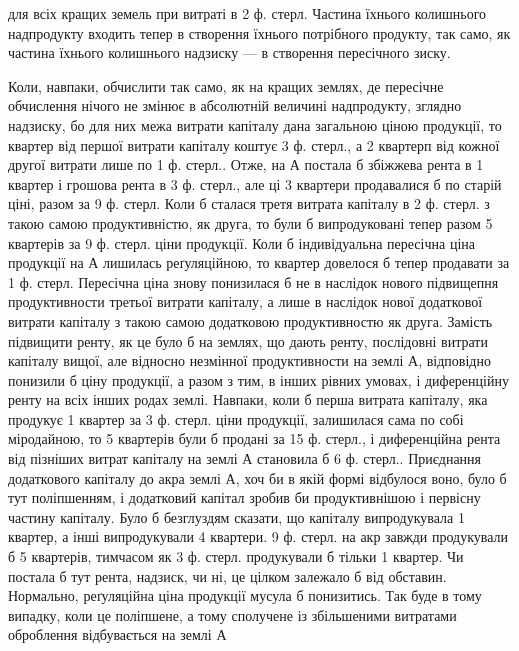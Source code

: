 \parcont{}  %
для всіх кращих земель при витраті в 2  ф. стерл. Частина їхнього колишнього
надпродукту входить тепер в створення їхнього потрібного продукту, так
само, як частина їхнього колишнього надзиску — в створення пересічного зиску.

Коли, навпаки, обчислити так само, як на кращих землях, де пересічне обчислення
нічого не змінює в абсолютній величині надпродукту, зглядно надзиску, бо для
них межа витрати капіталу дана загальною ціною продукції, то квартер від першої
витрати капіталу коштує 3 ф. стерл., а 2 квартерп від кожної другої витрати
лише по 1 ф. стерл.. Отже, на $А$ постала б збіжжева рента в 1 квартер
і грошова рента в 3 ф. стерл., але ці 3 квартери продавалися б по старій
ціні, разом за 9 ф. стерл. Коли б сталася третя витрата капіталу в 2  ф.
стерл. з такою самою продуктивністю, як друга, то були б випродуковані тепер
разом 5 квартерів за 9 ф. стерл. ціни продукції. Коли б індивідуальна
пересічна ціна продукції на $А$ лишилась реґуляційною, то квартер довелося б
тепер продавати за 1  ф. стерл. Пересічна ціна знову понизилася б не в
наслідок нового підвищепня продуктивности третьої витрати капіталу, а лише в
наслідок нової додаткової витрати капіталу з такою самою додатковою продуктивностю
як друга. Замість підвищити ренту, як це було б на землях, що дають
ренту, послідовні витрати капіталу вищої, але відносно незмінної продуктивности
на землі $А$, відповідно понизили б ціну продукції, а разом з тим, в інших
рівних умовах, і диференційну ренту на всіх інших родах землі. Навпаки,
коли б перша витрата капіталу, яка продукує 1 квартер за 3 ф. стерл. ціни
продукції, залишилася сама по собі міродайною, то 5 квартерів були б продані
за 15 ф. стерл., і диференційна рента від пізніших витрат капіталу на землі
$А$ становила б 6 ф. стерл.. Приєднання додаткового капіталу до акра землі $А$,
хоч би в якій формі відбулося воно, було б тут поліпшенням, і додатковий
капітал зробив би продуктивнішою і первісну частину капіталу. Було б безглуздям
сказати, що   капіталу випродукувала 1 квартер, а інші  випродукували
4 квартери. 9 ф. стерл. на акр завжди продукували б 5 квартерів, тимчасом
як 3 ф. стерл. продукували б тільки 1 квартер. Чи постала б тут рента, надзиск,
чи ні, це цілком залежало б від обставин. Нормально, реґуляційна ціна
продукції мусула б понизитись. Так буде в тому випадку, коли це поліпшене,
а тому сполучене із збільшеними витратами оброблення відбувається на землі $А$
